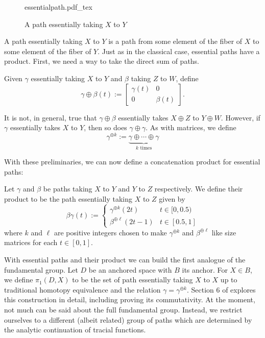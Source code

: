 \begin{figure}[h!]
\centering
  \def\svgwidth{0.9\columnwidth}
  {essentialpath.pdf_tex}
\caption{A path essentially taking \(X\) to \(Y\)}
\label{fig:esspath}
\end{figure}
A path essentially taking \(X\) to \(Y\) is a path from some element of the
fiber of \(X\) to some element of the fiber of \(Y\). Just as in the classical
case, essential paths have a product. First, we need a way to take the direct sum
of paths.

\begin{definition}%
  Given \(\gamma\) essentially taking \(X\) to \(Y\) and \(\beta\) taking \(Z\)
  to \(W\), define
  \[
    \gamma\oplus\beta(t) := \begin{bmatrix} \gamma(t)&0\\0&\beta(t) \end{bmatrix}.
  \]
\end{definition}

It is not, in general, true that \(\gamma\oplus\beta\) essentially takes
\(X\oplus Z\) to \(Y \oplus W\). However, if \(\gamma\) essentially takes \(X\)
to \(Y\), then so does \(\gamma\oplus\gamma\). As with matrices, we define
\[
  \gamma^{\oplus k} := \underbrace{\gamma\oplus \cdots \oplus\gamma}_{k \text{ times}}
\]

With these preliminaries, we can now define a concatenation product for
essential paths:
\begin{definition}%
\label{def:concatprod}
  Let \(\gamma\) and \(\beta\) be paths taking \(X\) to \(Y\) and \(Y\) to \(Z\)
  respectively. We define their product to be the path essentially taking \(X\)
  to \(Z\) given by
  \[
    \beta\gamma(t) :=
    \begin{cases}
      \gamma^{\oplus k}(2t) & t \in [0,0.5) \\
      \beta^{\oplus\ell} (2t-1)& t \in [0.5,1]
    \end{cases}
  \]
  where \(k\) and \(\ell\) are positive integers chosen to make
  \(\gamma^{\oplus k}\) and \(\beta^{\oplus \ell}\) like size matrices for each
  \(t \in [0,1]\).
\end{definition}

With essential paths and their product we can build the first analogue of the
fundamental group. Let \(D\) be an anchored space with \(B\) its anchor. For
\(X \in B\), we define \(\pi_1(D,X)\) to be the set of path essentially taking
\(X\) to \(X\) up to traditional homotopy equivalence and the relation
\(\gamma=\gamma^{\oplus k}\). Section 6 of
\cite{pascoeFreeNoncommutativePrincipal2020} explores this construction in
detail, including proving its commutativity.
At the moment, not much can be said about the full fundamental group. Instead,
we restrict ourselves to a different (albeit related) group of paths which are
determined by the analytic continuation of tracial functions.

